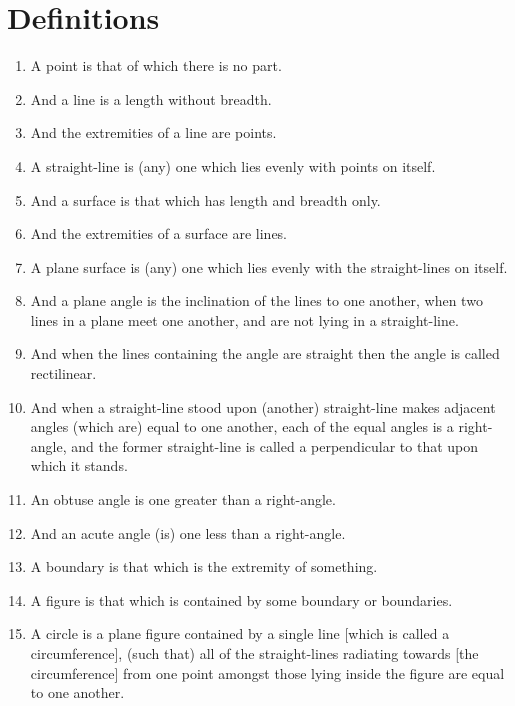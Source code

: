 \chapter{Definitions}

\begin{enumerate}
    \item \label{def:1} A point is that of which there is no part.
    \item \label{def:2} And a line is a length without breadth.
    \item \label{def:3} And the extremities of a line are points.
    \item \label{def:4} A straight-line is (any) one which lies evenly with points on itself.
    \item \label{def:5} And a surface is that which has length and breadth only.
    \item \label{def:6} And the extremities of a surface are lines.
    \item \label{def:7} A plane surface is (any) one which lies evenly with the straight-lines on itself.
    \item \label{def:8} And a plane angle is the inclination of the lines to one another, when two lines in a plane meet one another, and are not lying in a straight-line.
    \item \label{def:9} And when the lines containing the angle are straight then the angle is called rectilinear.
    \item \label{def:10} And when a straight-line stood upon (another) straight-line makes adjacent angles (which are) equal to one another, each of the equal angles is a right-angle, and the former straight-line is called a perpendicular to that upon which it stands.
    \item \label{def:11} An obtuse angle is one greater than a right-angle.
    \item \label{def:12} And an acute angle (is) one less than a right-angle.
    \item \label{def:13} A boundary is that which is the extremity of something.
    \item \label{def:14} A figure is that which is contained by some boundary or boundaries.
    \item \label{def:15} A circle is a plane figure contained by a single line [which is called a circumference], (such that) all of the straight-lines radiating towards [the circumference] from one point amongst those lying inside the figure are equal to one another.

\end{enumerate}
